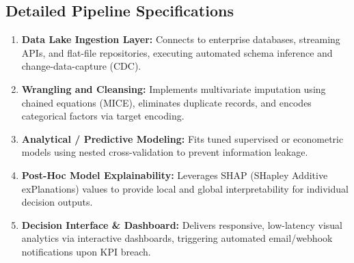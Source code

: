 \subsection{Detailed Pipeline Specifications}
\begin{enumerate}
  \item \textbf{Data Lake Ingestion Layer:} Connects to enterprise databases, streaming APIs, and flat-file repositories, executing automated schema inference and change-data-capture (CDC).
  \item \textbf{Wrangling and Cleansing:} Implements multivariate imputation using chained equations (MICE), eliminates duplicate records, and encodes categorical factors via target encoding.
  \item \textbf{Analytical / Predictive Modeling:} Fits tuned supervised or econometric models using nested cross-validation to prevent information leakage.
  \item \textbf{Post-Hoc Model Explainability:} Leverages SHAP (SHapley Additive exPlanations) values to provide local and global interpretability for individual decision outputs.
  \item \textbf{Decision Interface \& Dashboard:} Delivers responsive, low-latency visual analytics via interactive dashboards, triggering automated email/webhook notifications upon KPI breach.
\end{enumerate}
